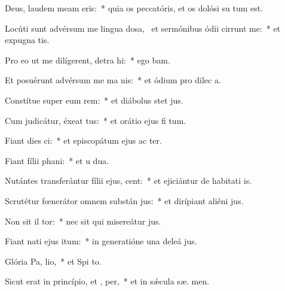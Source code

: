 \item Deus, laudem meam  eris:~* quia os peccatóris, et os dolósi su  tum est.
\item Locúti sunt advérsum me lingua dosa,~\pscross{} et sermónibus ódii cirrunt me:~* et expugna  tis.
\item Pro eo ut me dilígerent, detra hi:~* ego  bam.
\item Et posuérunt advérsum me ma  nis:~* et ódium pro dilec a.
\item Constítue super eum rem:~* et diábolus stet   jus.
\item Cum judicátur, éxeat tus:~* et orátio ejus fi  tum.
\item Fiant dies  ci:~* et episcopátum ejus ac ter.
\item Fiant fílii  phani:~* et u  dua.
\item Nutántes transferántur fílii ejus,  cent:~* et ejiciántur de habitati is.
\item Scrutétur fœnerátor omnem substán jus:~* et dirípiant aliéni  jus.
\item Non sit il tor:~* nec sit qui misereátur  jus.
\item Fiant nati ejus  itum:~* in generatióne una deleá  jus.
\item Glória Pa,  lio,~* et Spi to.
\item Sicut erat in princípio, et ,  per,~* et in sǽcula sæ. men.
